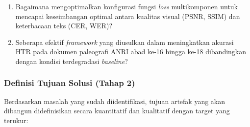 \documentclass[12pt,a4paper]{article}
\begin{document}
\begin{enumerate}[label=\arabic*., leftmargin=*, nosep]
\begin{enumerate}[label=RQ\arabic*:, leftmargin=*, nosep]
              \item Bagaimana mengoptimalkan konfigurasi fungsi \textit{loss} multikomponen untuk mencapai keseimbangan optimal antara kualitas visual (PSNR, SSIM) dan keterbacaan teks (CER, WER)?

              \item Seberapa efektif \textit{framework} yang diusulkan dalam meningkatkan akurasi HTR pada dokumen paleografi ANRI abad ke-16 hingga ke-18 dibandingkan dengan kondisi terdegradasi \textit{baseline}?
          \end{enumerate}
\end{enumerate}

\subsubsection{Definisi Tujuan Solusi (Tahap 2)}
Berdasarkan masalah yang sudah diidentifikasi, tujuan artefak yang akan dibangun didefinisikan secara kuantitatif dan kualitatif dengan target yang terukur:
\end{document}
